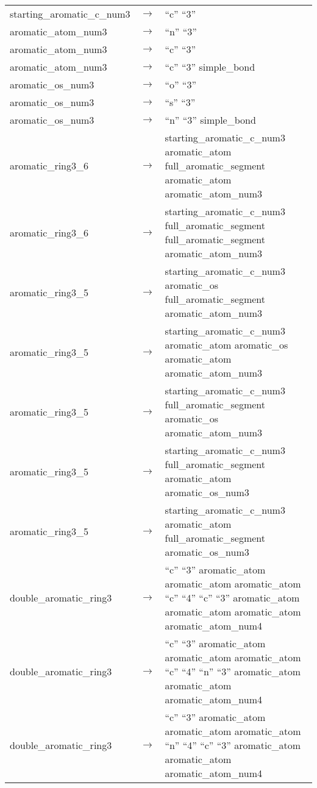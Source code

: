 \documentclass[../Document.tex]{subfiles}
\begin{document}
\begin{longtable}{m{} p{} p{}}
    starting\_aromatic\_c\_num3 & $\rightarrow$ & ``c'' ``3'' \\
    aromatic\_atom\_num3 & $\rightarrow$ & ``n'' ``3'' \\
    aromatic\_atom\_num3 & $\rightarrow$ & ``c'' ``3'' \\
    aromatic\_atom\_num3 & $\rightarrow$ & ``c'' ``3'' simple\_bond \\
    aromatic\_os\_num3 & $\rightarrow$ & ``o'' ``3'' \\
    aromatic\_os\_num3 & $\rightarrow$ & ``s'' ``3'' \\
    aromatic\_os\_num3 & $\rightarrow$ & ``n'' ``3'' simple\_bond \\
    aromatic\_ring3\_6 & $\rightarrow$ & starting\_aromatic\_c\_num3 aromatic\_atom full\_aromatic\_segment aromatic\_atom aromatic\_atom\_num3 \\
    aromatic\_ring3\_6 & $\rightarrow$ & starting\_aromatic\_c\_num3 full\_aromatic\_segment full\_aromatic\_segment aromatic\_atom\_num3 \\
    aromatic\_ring3\_5 & $\rightarrow$ & starting\_aromatic\_c\_num3 aromatic\_os full\_aromatic\_segment aromatic\_atom\_num3 \\
    aromatic\_ring3\_5 & $\rightarrow$ & starting\_aromatic\_c\_num3 aromatic\_atom aromatic\_os aromatic\_atom aromatic\_atom\_num3 \\
    aromatic\_ring3\_5 & $\rightarrow$ & starting\_aromatic\_c\_num3 full\_aromatic\_segment aromatic\_os aromatic\_atom\_num3 \\
    aromatic\_ring3\_5 & $\rightarrow$ & starting\_aromatic\_c\_num3 full\_aromatic\_segment aromatic\_atom aromatic\_os\_num3 \\
    aromatic\_ring3\_5 & $\rightarrow$ & starting\_aromatic\_c\_num3 aromatic\_atom full\_aromatic\_segment aromatic\_os\_num3 \\
    double\_aromatic\_ring3 & $\rightarrow$ & ``c'' ``3'' aromatic\_atom aromatic\_atom aromatic\_atom ``c'' ``4'' ``c'' ``3'' aromatic\_atom aromatic\_atom aromatic\_atom aromatic\_atom\_num4 \\
    double\_aromatic\_ring3 & $\rightarrow$ & ``c'' ``3'' aromatic\_atom aromatic\_atom aromatic\_atom ``c'' ``4'' ``n'' ``3'' aromatic\_atom aromatic\_atom aromatic\_atom\_num4 \\
    double\_aromatic\_ring3 & $\rightarrow$ & ``c'' ``3'' aromatic\_atom aromatic\_atom aromatic\_atom ``n'' ``4'' ``c'' ``3'' aromatic\_atom aromatic\_atom aromatic\_atom\_num4 \\

\end{longtable}
\end{document}
